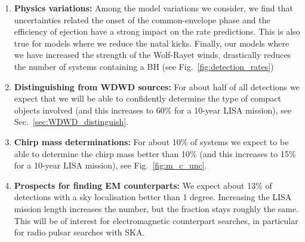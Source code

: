 \begin{enumerate}
    \item \textbf{Physics variations:}  Among the model variations we consider, we find that uncertainties related the onset of the common-envelope phase and the efficiency of ejection have a strong impact on the rate predictions. This is also true for models where we reduce the natal kicks. Finally, our models where we have increased the strength of the Wolf-Rayet winds, drastically reduces the number of systems containing a BH (see Fig.~\ref{fig:detection_rates})
    \item \textbf{Distinguishing from WDWD sources:} For about half of all detections we expect that we will be able to confidently determine the type of compact objects involved (and this increases to 60\% for a 10-year LISA mission), see Sec.~\ref{sec:WDWD_distinguish}.
    
    \item \textbf{Chirp mass determinations:} For about 10\% of systems we expect to be able to determine the chirp mass better than 10\% (and this increases to 15\% for a 10-year LISA mission), see Fig.~\ref{fig:m_c_unc}.
    
    
    \item \textbf{Prospects for finding EM counterparts:} We expect about 13\% of detections with a sky localisation better than 1 degree. Increasing the LISA mission length increases the number, but the fraction stays roughly the same. This will be of interest for electromagnetic counterpart searches, in particular for radio pulsar searches with SKA.      
    

\end{enumerate}
